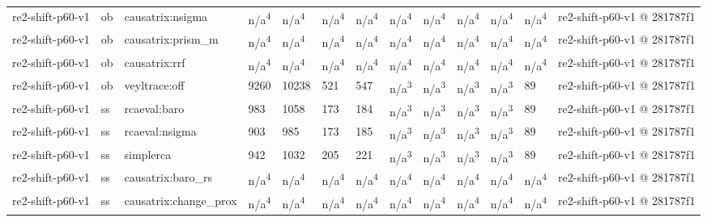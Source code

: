 \begin{table}[t]
\begin{tabular}{lllllllllllll}
re2-shift-p60-v1 & ob & causatrix:nsigma & n/a\textsuperscript{4} & n/a\textsuperscript{4} & n/a\textsuperscript{4} & n/a\textsuperscript{4} & n/a\textsuperscript{4} & n/a\textsuperscript{4} & n/a\textsuperscript{4} & n/a\textsuperscript{4} & n/a\textsuperscript{4} & re2-shift-p60-v1 @ 281787f1 \\
re2-shift-p60-v1 & ob & causatrix:prism\_m & n/a\textsuperscript{4} & n/a\textsuperscript{4} & n/a\textsuperscript{4} & n/a\textsuperscript{4} & n/a\textsuperscript{4} & n/a\textsuperscript{4} & n/a\textsuperscript{4} & n/a\textsuperscript{4} & n/a\textsuperscript{4} & re2-shift-p60-v1 @ 281787f1 \\
re2-shift-p60-v1 & ob & causatrix:rrf & n/a\textsuperscript{4} & n/a\textsuperscript{4} & n/a\textsuperscript{4} & n/a\textsuperscript{4} & n/a\textsuperscript{4} & n/a\textsuperscript{4} & n/a\textsuperscript{4} & n/a\textsuperscript{4} & n/a\textsuperscript{4} & re2-shift-p60-v1 @ 281787f1 \\
re2-shift-p60-v1 & ob & veyltrace:off & 9260 & 10238 & 521 & 547 & n/a\textsuperscript{3} & n/a\textsuperscript{3} & n/a\textsuperscript{3} & n/a\textsuperscript{3} & 89 & re2-shift-p60-v1 @ 281787f1 \\
re2-shift-p60-v1 & ss & rcaeval:baro & 983 & 1058 & 173 & 184 & n/a\textsuperscript{3} & n/a\textsuperscript{3} & n/a\textsuperscript{3} & n/a\textsuperscript{3} & 89 & re2-shift-p60-v1 @ 281787f1 \\
re2-shift-p60-v1 & ss & rcaeval:nsigma & 903 & 985 & 173 & 185 & n/a\textsuperscript{3} & n/a\textsuperscript{3} & n/a\textsuperscript{3} & n/a\textsuperscript{3} & 89 & re2-shift-p60-v1 @ 281787f1 \\
re2-shift-p60-v1 & ss & simplerca & 942 & 1032 & 205 & 221 & n/a\textsuperscript{3} & n/a\textsuperscript{3} & n/a\textsuperscript{3} & n/a\textsuperscript{3} & 89 & re2-shift-p60-v1 @ 281787f1 \\
re2-shift-p60-v1 & ss & causatrix:baro\_rs & n/a\textsuperscript{4} & n/a\textsuperscript{4} & n/a\textsuperscript{4} & n/a\textsuperscript{4} & n/a\textsuperscript{4} & n/a\textsuperscript{4} & n/a\textsuperscript{4} & n/a\textsuperscript{4} & n/a\textsuperscript{4} & re2-shift-p60-v1 @ 281787f1 \\
re2-shift-p60-v1 & ss & causatrix:change\_prox & n/a\textsuperscript{4} & n/a\textsuperscript{4} & n/a\textsuperscript{4} & n/a\textsuperscript{4} & n/a\textsuperscript{4} & n/a\textsuperscript{4} & n/a\textsuperscript{4} & n/a\textsuperscript{4} & n/a\textsuperscript{4} & re2-shift-p60-v1 @ 281787f1 \\

\end{tabular}
\end{table}
